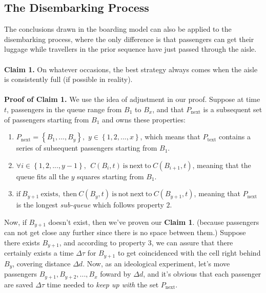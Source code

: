 \documentclass{article}
\theoremstyle{definition}
\theoremstyle{remark}
\numberwithin{equation}{section}
\begin{document}
	\subsection{The Disembarking Process}
	The conclusions drawn in the boarding model can also be applied to the disembarking process, where the only difference is that passengers can get their luggage while travellers in the prior sequence have just passed through the aisle.
	\\ \\
	\textbf{Claim 1.} On whatever occasions, the best strategy always comes when the aisle is consistently full (if possible in reality).
	\\ \\
	\textbf{Proof of Claim 1.} We use the idea of adjustment in our proof. Suppose at time \(t\), passengers in the queue range from \(B_1\) to \(B_x\), and that \(P_\mathrm{next}\) is a subsequent set of passengers starting from \(B_1\) and owns these properties:
	\begin{enumerate}
		\item \(P_{\mathrm{next}}=\left\{ B_1,...,B_y \right\} ,\,\,y\in \left\{ 1,2,...,x \right\} \), which means that \(P_{\mathrm{text}}\) contains a series of subsequent passengers starting from \(B_1\).
		\item \(\forall i\in \left\{ 1,2,...,y-1 \right\} ,\:\:C\left( B_i,t \right) \:\mathrm{is}\:\mathrm{next}\:\mathrm{to}\:C\left( B_{i+1},t \right) \), meaning that the queue fits all the \(y\) squares starting from \(B_1\).
		\item \(\mathrm{if}\:B_{y+1}\:\mathrm{exists},\:\mathrm{then}\:C\left( B_y,t \right) \:\mathrm{is}\:\mathrm{not}\:\mathrm{next}\:\mathrm{to}\:C\left( B_{y+1},t \right) \), meaning that \(P_{\mathrm{next}}\) is the longest \textit{sub-queue} which follows property \(2\).
	\end{enumerate}

	Now, if \(B_{y+1}\) doesn't exist, then we've proven our \textbf{Claim 1}. (because passengers can not get close any further since there is no space between them.) Suppose there exists \(B_{y+1}\), and according to property \(3\), we can assure that there certainly exists a time $\Delta\tau$ for \(B_{y+1}\) to get coincidenced with the cell right behind \(B_y\), covering distance \(\Delta d\). Now, as an ideological experiment, let's move passengers \(B_{y+1},B_{y+2},...,B_x\) foward by \(\Delta d\), and it's obvious that each passenger are saved \(\Delta \tau\) time needed to \textit{keep up with} the set \(P_{\mathrm{next}}\).
\end{document}
